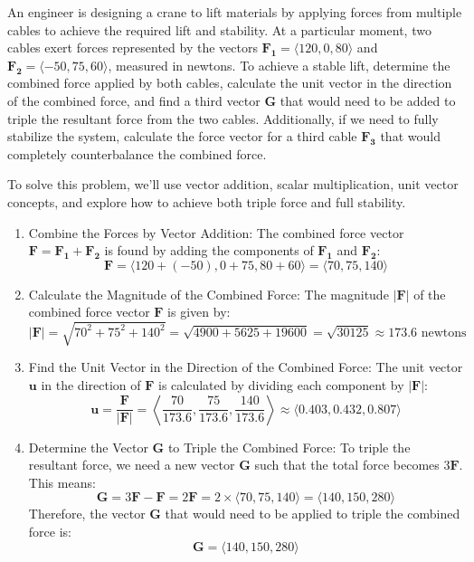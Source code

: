 \exampleline
\begin{example}
An engineer is designing a crane to lift materials by applying forces from multiple cables to achieve the required lift and stability. At a particular moment, two cables exert forces represented by the vectors \( \mathbf{F_1} = \langle 120, 0, 80 \rangle \) and \( \mathbf{F_2} = \langle -50, 75, 60 \rangle \), measured in newtons. To achieve a stable lift, determine the combined force applied by both cables, calculate the unit vector in the direction of the combined force, and find a third vector \( \mathbf{G} \) that would need to be added to triple the resultant force from the two cables. Additionally, if we need to fully stabilize the system, calculate the force vector for a third cable \( \mathbf{F_3} \) that would completely counterbalance the combined force.

\begin{solution}
To solve this problem, we’ll use vector addition, scalar multiplication, unit vector concepts, and explore how to achieve both triple force and full stability.

\begin{enumerate}
    \item Combine the Forces by Vector Addition: The combined force vector \( \mathbf{F} = \mathbf{F_1} + \mathbf{F_2} \) is found by adding the components of \( \mathbf{F_1} \) and \( \mathbf{F_2} \):
    \[
    \mathbf{F} = \langle 120 + (-50), 0 + 75, 80 + 60 \rangle = \langle 70, 75, 140 \rangle
    \]

    \item Calculate the Magnitude of the Combined Force: The magnitude \( |\mathbf{F}| \) of the combined force vector \( \mathbf{F} \) is given by:
    \[
    |\mathbf{F}| = \sqrt{70^2 + 75^2 + 140^2} = \sqrt{4900 + 5625 + 19600} = \sqrt{30125} \approx 173.6 \text{ newtons}
    \]

    \item Find the Unit Vector in the Direction of the Combined Force: The unit vector \( \mathbf{u} \) in the direction of \( \mathbf{F} \) is calculated by dividing each component by \( |\mathbf{F}| \):
    \[
    \mathbf{u} = \frac{\mathbf{F}}{|\mathbf{F}|} = \left\langle \frac{70}{173.6}, \frac{75}{173.6}, \frac{140}{173.6} \right\rangle \approx \langle 0.403, 0.432, 0.807 \rangle
    \]

    \item Determine the Vector \( \mathbf{G} \) to Triple the Combined Force: To triple the resultant force, we need a new vector \( \mathbf{G} \) such that the total force becomes \( 3\mathbf{F} \). This means:
    \[
    \mathbf{G} = 3\mathbf{F} - \mathbf{F} = 2\mathbf{F} = 2 \times \langle 70, 75, 140 \rangle = \langle 140, 150, 280 \rangle
    \]
    Therefore, the vector \( \mathbf{G} \) that would need to be applied to triple the combined force is:
    \[
    \mathbf{G} = \langle 140, 150, 280 \rangle
    \]


\end{enumerate}
\end{solution}
\end{example}
